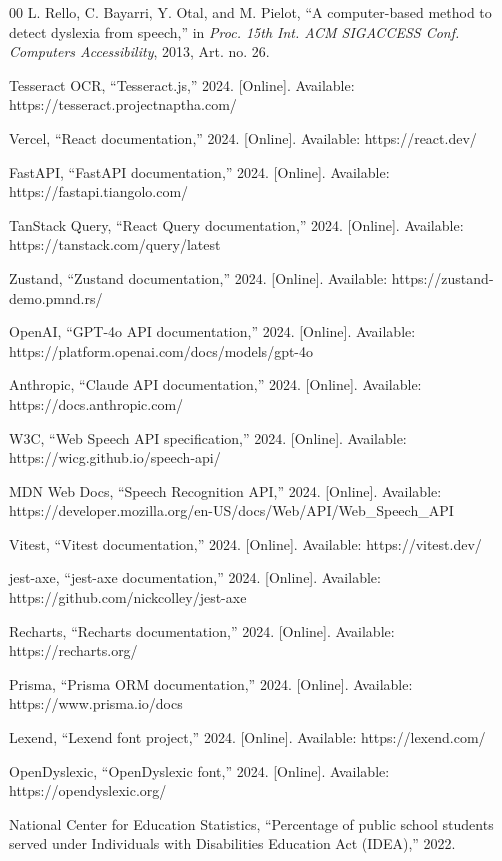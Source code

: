 \documentclass[journal]{IEEEtran}
\begin{document}
\begin{thebibliography}{00}
 L. Rello, C. Bayarri, Y. Otal, and M. Pielot, ``A computer-based method to detect dyslexia from speech,'' in \textit{Proc. 15th Int. ACM SIGACCESS Conf. Computers Accessibility}, 2013, Art. no. 26.

 Tesseract OCR, ``Tesseract.js,'' 2024. [Online]. Available: https://tesseract.projectnaptha.com/

 Vercel, ``React documentation,'' 2024. [Online]. Available: https://react.dev/

 FastAPI, ``FastAPI documentation,'' 2024. [Online]. Available: https://fastapi.tiangolo.com/

 TanStack Query, ``React Query documentation,'' 2024. [Online]. Available: https://tanstack.com/query/latest

 Zustand, ``Zustand documentation,'' 2024. [Online]. Available: https://zustand-demo.pmnd.rs/

 OpenAI, ``GPT-4o API documentation,'' 2024. [Online]. Available: https://platform.openai.com/docs/models/gpt-4o

 Anthropic, ``Claude API documentation,'' 2024. [Online]. Available: https://docs.anthropic.com/

 W3C, ``Web Speech API specification,'' 2024. [Online]. Available: https://wicg.github.io/speech-api/

 MDN Web Docs, ``Speech Recognition API,'' 2024. [Online]. Available: https://developer.mozilla.org/en-US/docs/Web/API/Web\_Speech\_API

 Vitest, ``Vitest documentation,'' 2024. [Online]. Available: https://vitest.dev/

 jest-axe, ``jest-axe documentation,'' 2024. [Online]. Available: https://github.com/nickcolley/jest-axe

 Recharts, ``Recharts documentation,'' 2024. [Online]. Available: https://recharts.org/

 Prisma, ``Prisma ORM documentation,'' 2024. [Online]. Available: https://www.prisma.io/docs

 Lexend, ``Lexend font project,'' 2024. [Online]. Available: https://lexend.com/

 OpenDyslexic, ``OpenDyslexic font,'' 2024. [Online]. Available: https://opendyslexic.org/

 National Center for Education Statistics, ``Percentage of public school students served under Individuals with Disabilities Education Act (IDEA),'' 2022.


\end{thebibliography}
\end{document}

